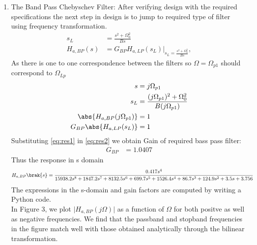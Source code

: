 \documentclass{article}
\begin{document}
\begin{enumerate}
    \item {The Band Pass Chebyschev Filter:}
          After verifying design with the required specifications the next step in design is to jump to required type of filter using frequency transformation. 
          \begin{align}
              s_L         & = \frac{s^2 + \Omega_0^2}{Bs}                                   \\
              H_{a,BP}(s) & = G_{BP}H_{a,LP}(s_L)\vert_{s_L = \frac{s^2 + \Omega_0^2}{Bs}},
          \end{align}
          As there is one to one correspondence between the filters so $\Omega=\Omega_{p1}$ should correspond to $\Omega_{Lp}$
          \begin{align}
              s                            & = j\Omega_{p1}                                                          \\
              s_{L}                        & = \frac{(j\Omega_{p1})^2 + \Omega_0^2}{B(j\Omega_{p1})} \label{eq:res1} \\ 
              \abs{H_{a,BP}(j\Omega_{p1})} & = 1                                                                     \\
              G_{BP}\abs{H_{a,LP}(s_L)}    & = 1 \label{eq:res2}
          \end{align}
          Substituting \eqref{eq:res1} in \eqref{eq:res2} we obtain Gain of required bass pass filter:
          \begin{align}
              G_{BP} & = 1.0407 
          \end{align}
          Thus the response in s domain 
          \begin{align}
              H_{a,BP}\brak{s} & = \frac{0.417s^4}{15938.2s^8 + 1847.2s^7 + 8132.5s^6 + 699.7s^5 + 1526.4s^4 + 86.7s^3 + 124.9s^2 + 3.5s + 3.756}
              \label{eq:magnitude_bandpass_sdom}
          \end{align}
          The expressions in the s-domain and gain factors are computed by writing a Python code. \\
          In Figure 3, we plot $\vert H_{a,BP}(j\Omega)\vert$ as a function of $\Omega$ for both positve as
          well as negative frequencies.  We find that the passband and stopband frequencies in the figure
          match well with those obtained analytically through the bilinear transformation.
          \begin{figure}[H]
              \centering

\end{figure}
\end{enumerate}
\end{document}
